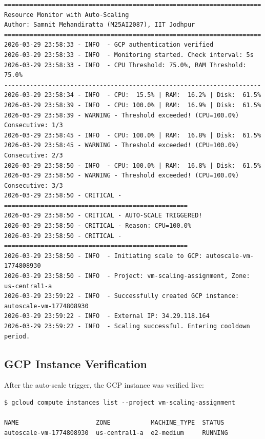 \documentclass[12pt,a4paper]{article}
\begin{document}
\begin{lstlisting}[style=logstyle, caption={Actual monitor.log output from demo run}]
======================================================================
Resource Monitor with Auto-Scaling
Author: Samnit Mehandiratta (M25AI2087), IIT Jodhpur
======================================================================
2026-03-29 23:58:33 - INFO  - GCP authentication verified
2026-03-29 23:58:33 - INFO  - Monitoring started. Check interval: 5s
2026-03-29 23:58:33 - INFO  - CPU Threshold: 75.0%, RAM Threshold: 75.0%
----------------------------------------------------------------------
2026-03-29 23:58:34 - INFO  - CPU:  15.5% | RAM:  16.2% | Disk:  61.5%
2026-03-29 23:58:39 - INFO  - CPU: 100.0% | RAM:  16.9% | Disk:  61.5%
2026-03-29 23:58:39 - WARNING - Threshold exceeded! (CPU=100.0%) Consecutive: 1/3
2026-03-29 23:58:45 - INFO  - CPU: 100.0% | RAM:  16.8% | Disk:  61.5%
2026-03-29 23:58:45 - WARNING - Threshold exceeded! (CPU=100.0%) Consecutive: 2/3
2026-03-29 23:58:50 - INFO  - CPU: 100.0% | RAM:  16.8% | Disk:  61.5%
2026-03-29 23:58:50 - WARNING - Threshold exceeded! (CPU=100.0%) Consecutive: 3/3
2026-03-29 23:58:50 - CRITICAL - ==================================================
2026-03-29 23:58:50 - CRITICAL - AUTO-SCALE TRIGGERED!
2026-03-29 23:58:50 - CRITICAL - Reason: CPU=100.0%
2026-03-29 23:58:50 - CRITICAL - ==================================================
2026-03-29 23:58:50 - INFO  - Initiating scale to GCP: autoscale-vm-1774808930
2026-03-29 23:58:50 - INFO  - Project: vm-scaling-assignment, Zone: us-central1-a
2026-03-29 23:59:22 - INFO  - Successfully created GCP instance: autoscale-vm-1774808930
2026-03-29 23:59:22 - INFO  - External IP: 34.29.118.164
2026-03-29 23:59:22 - INFO  - Scaling successful. Entering cooldown period.
\end{lstlisting}

\subsection{GCP Instance Verification}

After the auto-scale trigger, the GCP instance was verified live:

\begin{lstlisting}[style=bashstyle, caption={GCP instance list after auto-scaling}]
$ gcloud compute instances list --project vm-scaling-assignment

NAME                     ZONE           MACHINE_TYPE  STATUS
autoscale-vm-1774808930  us-central1-a  e2-medium     RUNNING
\end{lstlisting}
\end{document}
